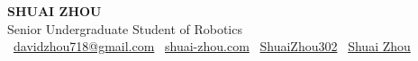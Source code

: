 \documentclass[a4paper,9pt]{extarticle}
\begin{document}
\pagestyle{fancy}
\renewcommand{\headrulewidth}{0pt}
\fancyhead{}
\thispagestyle{empty} %

\begin{center}
{\fontsize{24pt}{36pt}\selectfont\textbf{SHUAI ZHOU}}\\[3pt] %
Senior Undergraduate Student of Robotics \\[2pt]
\faEnvelope\ \href{mailto:davidzhou718@gmail.com}{davidzhou718@gmail.com}
\quad \textbar{} \quad
\faHome\ \href{https://www.shuai-zhou.com}{shuai-zhou.com}
\quad \textbar{} \quad
\faGithub\ \href{https://github.com/ShuaiZhou302}{ShuaiZhou302}
\quad \textbar{} \quad
\faGraduationCap\ \href{https://scholar.google.com/citations?user=ONn1TXAAAAAJ&hl=en&oi=sra}{Shuai Zhou}
\end{center}

\end{document}
